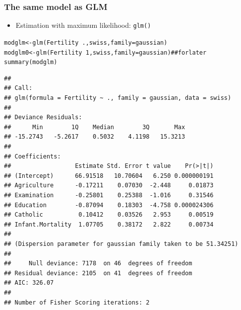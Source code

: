 \documentclass[extsize,handout,10pt]{beamer}\usepackage[]{graphicx}\usepackage[]{color}
\makeatletter
\newcommand{\hlnum}[1]{\textcolor[rgb]{0.502,0.086,1}{#1}}%
\newcommand{\hlcom}[1]{\textcolor[rgb]{1,0.251,0.502}{#1}}%
\newcommand{\hlopt}[1]{\textcolor[rgb]{0.251,0.251,0.251}{#1}}%
\newcommand{\hlstd}[1]{\textcolor[rgb]{0.251,0.251,0.251}{#1}}%
\newcommand{\hlkwb}[1]{\textcolor[rgb]{0,0.439,0.902}{#1}}%
\newcommand{\hlkwc}[1]{\textcolor[rgb]{0.188,0.941,0.314}{#1}}%
\newcommand{\hlkwd}[1]{\textcolor[rgb]{0.69,0.188,0.941}{#1}}%
\newenvironment{kframe}{%
 \def\at@end@of@kframe{}%
 \ifinner\ifhmode%
  \def\at@end@of@kframe{\end{minipage}}%
  \begin{minipage}{\columnwidth}%
 \fi\fi%
 \def\FrameCommand##1{\hskip\@totalleftmargin \hskip-\fboxsep
 \colorbox{shadecolor}{##1}\hskip-\fboxsep
     \hskip-\linewidth \hskip-\@totalleftmargin \hskip\columnwidth}%
 \MakeFramed {\advance\hsize-\width
   \@totalleftmargin\z@ \linewidth\hsize
   \@setminipage}}%
 {\par\unskip\endMakeFramed%
 \at@end@of@kframe}
\newenvironment{knitrout}{}{} %
\makeatother
\begin{document}
\begin{frame}[fragile]
  \frametitle{The same model as GLM}

    \begin{itemize}
    \item Estimation with maximum likelihood: \texttt{glm()}
    \end{itemize}

\begin{knitrout}\tiny
{}\color{fgcolor}\begin{kframe}
\begin{alltt}
\hlstd{modglm}\hlkwb{<-}\hlkwd{glm}\hlstd{(Fertility}\hlopt{~}\hlstd{.,swiss,}\hlkwc{family}\hlstd{=gaussian)}
\hlstd{modglm0}\hlkwb{<-}\hlkwd{glm}\hlstd{(Fertility}\hlopt{~}\hlnum{1}\hlstd{,swiss,}\hlkwc{family}\hlstd{=gaussian)}\hlcom{## for later}
\hlkwd{summary}\hlstd{(modglm)}
\end{alltt}
\begin{verbatim}
## 
## Call:
## glm(formula = Fertility ~ ., family = gaussian, data = swiss)
## 
## Deviance Residuals: 
##      Min        1Q    Median        3Q       Max  
## -15.2743   -5.2617    0.5032    4.1198   15.3213  
## 
## Coefficients:
##                  Estimate Std. Error t value    Pr(>|t|)
## (Intercept)      66.91518   10.70604   6.250 0.000000191
## Agriculture      -0.17211    0.07030  -2.448     0.01873
## Examination      -0.25801    0.25388  -1.016     0.31546
## Education        -0.87094    0.18303  -4.758 0.000024306
## Catholic          0.10412    0.03526   2.953     0.00519
## Infant.Mortality  1.07705    0.38172   2.822     0.00734
## 
## (Dispersion parameter for gaussian family taken to be 51.34251)
## 
##     Null deviance: 7178  on 46  degrees of freedom
## Residual deviance: 2105  on 41  degrees of freedom
## AIC: 326.07
## 
## Number of Fisher Scoring iterations: 2
\end{verbatim}
\end{kframe}
\end{knitrout}
\end{frame}
\end{document}
